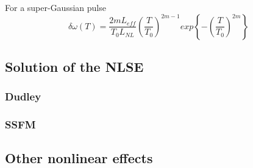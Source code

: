         
         For a super-Gaussian pulse 
            \begin{equation}
                \delta \omega(T) = \frac{2m L_{eff}}{T_0 L_{NL}}\left( \frac{T}{T_0}\right)^{2m-1}  exp\left\{ -\left( \frac{T}{T_0}\right)^{2m}   \right\}
            \end{equation}
        
        \subsection{Solution of the NLSE}
            \subsubsection{Dudley}
            \subsubsection{SSFM}
            
        \subsection{Other nonlinear effects}


